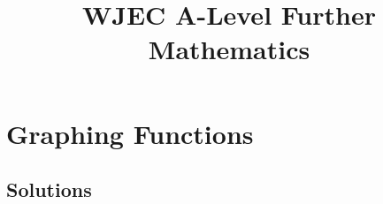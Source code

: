 \documentclass[answers]{exam}
\title{WJEC A-Level Further Mathematics}
\begin{document}
\section{Graphing Functions}

\subsection{Solutions}

\end{document}
